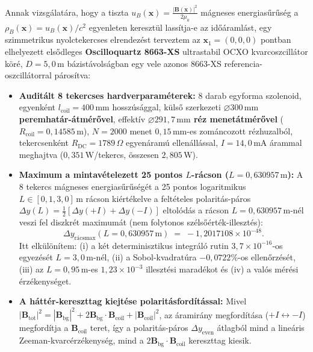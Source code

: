 \documentclass[10pt,a4paper]{article}
\begin{document}
\par
Annak vizsg\'alat\'ara, hogy a tiszta $u_B(\mathbf{x}) = \frac{|\mathbf{B}(\mathbf{x})|^2}{2\mu_0}$ m\'agneses energias\H{u}r\H{u}s\'eg a $\rho_B(\mathbf{x}) = u_B(\mathbf{x})/c^2$ egyenleten kereszt\"ul lass\'itja-e az id\H{o}\'araml\'ast, egy szimmetrikus nyolctekercses elrendez\'est terveztem az $\mathbf{x}_1 = (0,0,0)$ pontban elhelyezett els\H{o}dleges \textbf{Oscilloquartz 8663-XS} ultrastabil OCXO kvarcoszcill\'ator k\"or\'e, $D = 5{,}0\,\text{m}$ b\'azist\'avols\'agban egy vele azonos 8663-XS referencia-oszcill\'atorral p\'aros\'itva:
\begin{itemize}\setlength{\itemsep}{1pt}\setlength{\parskip}{0pt}\setlength{\topsep}{1pt}
  \item \textbf{Audit\'alt 8 tekercses hardverparam\'eterek:} 8 darab egyforma szolenoid, egyenk\'ent $l_{\text{coil}} = 400\,\text{mm}$ hossz\'us\'aggal, k\"uls\H{o} szerkezeti \textbf{$\varnothing 300\,\text{mm}$ peremhat\'ar-\'atm\'er\H{o}vel}, effekt\'iv \textbf{$\varnothing 291{,}7\,\text{mm}$ r\'ez menet\'atm\'er\H{o}vel} ($R_{\text{coil}} = 0{,}14585\,\text{m}$), $N = 2000$ menet $0{,}15\,\text{mm}$-es zom\'ancozott r\'ezhuzalb\'ol, tekercsenk\'ent $R_{\text{DC}} = 1789\,\Omega$ egyen\'aram\'u ellen\'all\'assal, $I = 14{,}0\,\text{mA}$ \'arammal meghajtva ($0{,}351\,\text{W}$/tekercs, \"osszesen $2{,}805\,\text{W}$).
  \item \textbf{Maximum a mintav\'etelezett 25 pontos $L$-r\'acson ($L = 0{,}630957\,\text{m}$):} A 8 tekercs m\'agneses energias\H{u}r\H{u}s\'eg\'et a 25 pontos logaritmikus $L \in [0{,}1, 3{,}0]\,\text{m}$ r\'acson ki\'ert\'ekelve a felt\'eteles polarit\'as-p\'aros $\Delta y(L) = \frac{1}{2}[\Delta y(+I) + \Delta y(-I)]$ eltol\'od\'as a r\'acson \textbf{$L = 0{,}630957\,\text{m}$}-n\'el veszi fel diszkr\'et maximum\'at (nem folytonos sz\'els\H{o}\'ert\'ek-illeszt\'es):
  \begin{equation}
    \Delta y_{\text{r\'acsmax}}(L = 0{,}630957\,\text{m}) \;=\; -1{,}2017108\times 10^{-48}.
  \end{equation}
  Itt elk\"ul\"on\'item: (i) a k\'et determinisztikus integr\'al\'o rutin $3{,}7\times 10^{-16}$-os egyez\'es\'et $L=3{,}0\,\text{m}$-n\'el, (ii) a Sobol-kvadrat\'ura $-0{,}0722\%$-os ellen\H{o}rz\'es\'et, (iii) az $L=0{,}95\,\text{m}$-es $1{,}23\times 10^{-3}$ illeszt\'esi marad\'ekot \'es (iv) a val\'os m\'er\'esi \'erz\'ekenys\'eget.
  \item \textbf{A h\'att\'er-kereszttag kiejt\'ese polarit\'asford\'it\'assal:} Mivel $|\mathbf{B}_{\text{tot}}|^2 = |\mathbf{B}_{\text{bg}}|^2 + 2\mathbf{B}_{\text{bg}}\cdot\mathbf{B}_{\text{coil}} + |\mathbf{B}_{\text{coil}}|^2$, az \'aramir\'any megford\'it\'asa ($+I \leftrightarrow -I$) megford\'itja a $\mathbf{B}_{\text{coil}}$ teret, \'igy a polarit\'as-p\'aros $\Delta y_{\text{even}}$ \'atlagb\'ol mind a line\'aris Zeeman-kvarc\'erz\'ekenys\'eg, mind a $2\mathbf{B}_{\text{bg}}\cdot\mathbf{B}_{\text{coil}}$ kereszttag kiesik.
\end{itemize}
\end{document}
